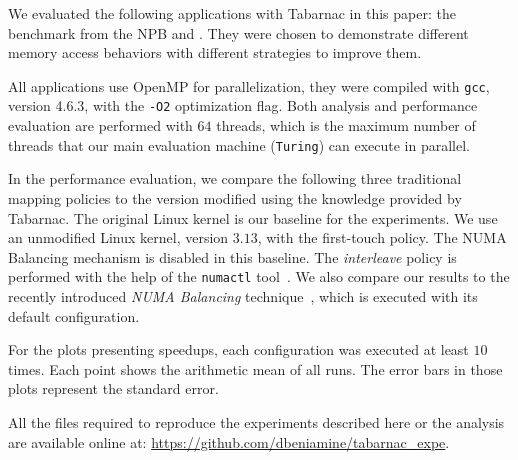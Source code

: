 We evaluated the following applications with \gls{Tabarnac} in this paper: the \IS benchmark from the \gls{NPB} and \Ondes.
They were chosen to demonstrate different memory access behaviors with different strategies to improve them.

All applications use OpenMP for parallelization, they were compiled with \texttt{gcc}, version 4.6.3, with the \texttt{-O2} optimization flag.
Both analysis and performance evaluation are performed with $64$ threads, which is the maximum number of threads that our main evaluation machine (\texttt{Turing}) can execute in parallel.

In the performance evaluation, we compare the following three traditional mapping policies to the version modified using the knowledge provided by \gls{Tabarnac}.
The original \gls{Linux} kernel is our baseline for the experiments.
We use an unmodified Linux kernel, version $3.13$, with the first-touch policy.
The NUMA Balancing mechanism is disabled in this baseline.
The \emph{interleave} policy is performed with the help of the \texttt{numactl} tool~\cite{Kleen05NUMA}.
We also compare our results to the recently introduced \emph{NUMA Balancing} technique~\cite{Corbet12Toward}, which is executed with its default configuration.

For the plots presenting speedups, each configuration was executed at least $10$ times.
Each point shows the arithmetic mean of all runs.
The error bars in those plots represent the standard error.

All the files required to reproduce the experiments described here or the analysis are available online at: \url{https://github.com/dbeniamine/tabarnac\_expe}.

